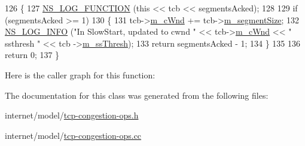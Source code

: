 \begin{DoxyCode}
126 \{
127   \hyperlink{log-macros-disabled_8h_a90b90d5bad1f39cb1b64923ea94c0761}{NS\_LOG\_FUNCTION} (\textcolor{keyword}{this} << tcb << segmentsAcked);
128 
129   \textcolor{keywordflow}{if} (segmentsAcked >= 1)
130     \{
131       tcb->\hyperlink{classns3_1_1TcpSocketState_a7cd3d2156a483c1db436097477a0fd7f}{m\_cWnd} += tcb->\hyperlink{classns3_1_1TcpSocketState_a079872f7b0099ef5f3cab4ff47bd2edd}{m\_segmentSize};
132       \hyperlink{group__logging_gafbd73ee2cf9f26b319f49086d8e860fb}{NS\_LOG\_INFO} (\textcolor{stringliteral}{"In SlowStart, updated to cwnd "} << tcb->\hyperlink{classns3_1_1TcpSocketState_a7cd3d2156a483c1db436097477a0fd7f}{m\_cWnd} << \textcolor{stringliteral}{" ssthresh "} << tcb
      ->\hyperlink{classns3_1_1TcpSocketState_aec003b6dba9d269bfb1036c7652ffbd6}{m\_ssThresh});
133       \textcolor{keywordflow}{return} segmentsAcked - 1;
134     \}
135 
136   \textcolor{keywordflow}{return} 0;
137 \}
\end{DoxyCode}


Here is the caller graph for this function\+:




The documentation for this class was generated from the following files\+:\begin{DoxyCompactItemize}
\item 
internet/model/\hyperlink{tcp-congestion-ops_8h}{tcp-\/congestion-\/ops.\+h}\item 
internet/model/\hyperlink{tcp-congestion-ops_8cc}{tcp-\/congestion-\/ops.\+cc}\end{DoxyCompactItemize}
